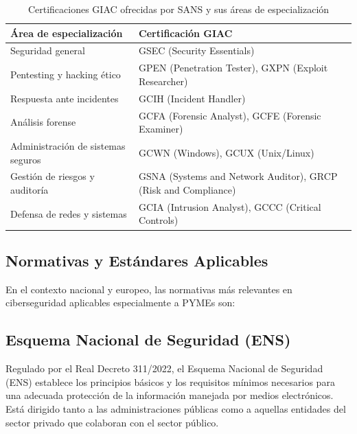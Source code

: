 \documentclass[a4paper, 10pt]{article}
\begin{document}
\begin{table}[H]
\centering
\caption{Certificaciones GIAC ofrecidas por SANS y sus áreas de especialización}
\begin{tabular}{|l|l|}
\hline
\textbf{Área de especialización} & \textbf{Certificación GIAC} \\
\hline
Seguridad general & GSEC (Security Essentials) \\
Pentesting y hacking ético & GPEN (Penetration Tester), GXPN (Exploit Researcher) \\
Respuesta ante incidentes & GCIH (Incident Handler) \\
Análisis forense & GCFA (Forensic Analyst), GCFE (Forensic Examiner) \\
Administración de sistemas seguros & GCWN (Windows), GCUX (Unix/Linux) \\
Gestión de riesgos y auditoría & GSNA (Systems and Network Auditor), GRCP (Risk and Compliance) \\
Defensa de redes y sistemas & GCIA (Intrusion Analyst), GCCC (Critical Controls) \\
\hline
\end{tabular}
\label{tab:giac-certificaciones}
\end{table}

\subsection{Normativas y Estándares Aplicables}
\par\vspace{0.5cm}

En el contexto nacional y europeo, las normativas más relevantes en ciberseguridad aplicables especialmente a PYMEs son:
\par\vspace{0.5cm}

\subsection*{Esquema Nacional de Seguridad (ENS)}

Regulado por el Real Decreto 311/2022, el Esquema Nacional de Seguridad (ENS) establece los principios básicos y los requisitos mínimos necesarios para una adecuada protección de la información manejada por medios electrónicos. Está dirigido tanto a las administraciones públicas como a aquellas entidades del sector privado que colaboran con el sector público.
\par\vspace{0.5cm}
\end{document}

